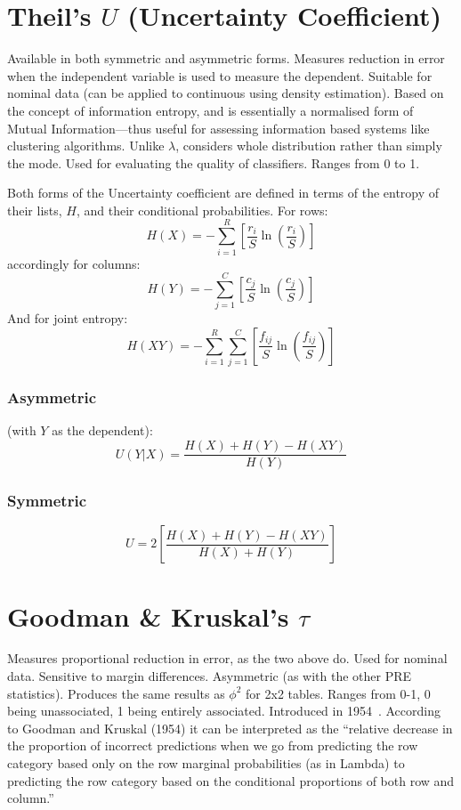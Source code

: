 \documentclass[11pt]{article}
\begin{document}
\section{Theil's $U$ (Uncertainty Coefficient)}
Available in both symmetric and asymmetric forms.  Measures reduction in error when the independent variable is used to measure the dependent.  Suitable for nominal data (can be applied to continuous using density estimation).  Based on the concept of information entropy, and is essentially a normalised form of Mutual Information---thus useful for assessing information based systems like clustering algorithms.  Unlike $\lambda$, considers whole distribution rather than simply the mode.  Used for evaluating the quality of classifiers.  Ranges from 0 to 1.

Both forms of the Uncertainty coefficient are defined in terms of the entropy of their lists, $H$, and their conditional probabilities.  For rows:
$$
H(X) = -\sum_{i=1}^{R}{ \left[ \frac{ r_i }{ S }       \ln \left( \frac{ r_i }{ S } \right) \right] }
$$
accordingly for columns:
$$
H(Y) = -\sum_{j=1}^{C}{ \left[ \frac{ c_j }{ S }       \ln \left( \frac{ c_j }{ S } \right) \right] }
$$
And for joint entropy:
$$
H(XY) = -\sum_{i=1}^{R}{  \sum_{j=1}^{C}{ \left[    \frac{ f_{ij} }{S}  \ln \left( \frac{ f_{ij} }{ S } \right)     \right] } }
$$

\subsubsection{Asymmetric}
(with $Y$ as the dependent):
$$
U(Y|X) = \frac{ H(X) + H(Y) - H(XY) }{ H(Y) }
$$

\subsubsection{Symmetric}
$$
U = 2 \left[ \frac{ H(X) + H(Y) - H(XY) }{ H(X) + H(Y) } \right]
$$





\section{Goodman \& Kruskal's $\tau$}
Measures proportional reduction in error, as the two above do.  Used for nominal data. Sensitive to margin differences.  Asymmetric (as with the other PRE statistics).  Produces the same results as $\phi^2$ for 2x2 tables.  Ranges from 0-1, 0 being unassociated, 1 being entirely associated.  Introduced in 1954~\cite{goodman1954measures}.
According to Goodman and Kruskal (1954) it can be interpreted as the ``relative decrease in the proportion of incorrect predictions when we go from predicting the row category based only on the row marginal probabilities (as in Lambda) to predicting the row category based on the conditional proportions of both row and column.''
\end{document}
